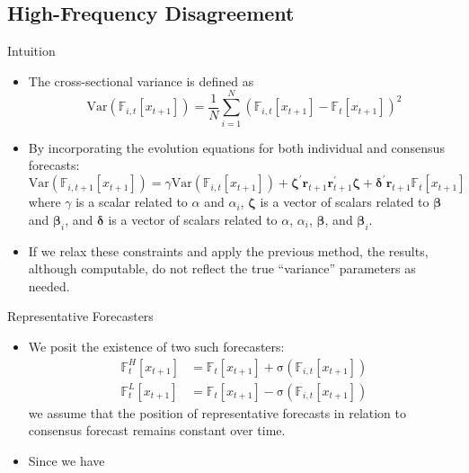 \documentclass[UTF8, 10pt]{beamer}
\begin{document}
\begin{CJK*}{UTF8}{gbsn}
\section{High-Frequency Disagreement}
\begin{frame}{Intuition}
	\begin{itemize}
		\item The \alert{cross-sectional variance} is defined as 
			$$
			\mathrm{Var}(\mathbb{F}_{i, t}\left[x_{t+1}\right]) = \frac{1}{N}\sum_{i=1}^N (\mathbb{F}_{i, t}\left[x_{t+1}\right]-\mathbb{F}_{t}\left[x_{t+1}\right])^2
			$$
		\item By incorporating the \alert{evolution equations} for both individual and consensus forecasts:
			$$
			\mathrm{Var}(\mathbb{F}_{i, t+1}\left[x_{t+1}\right])
		    =
		    \gamma \mathrm{Var}(\mathbb{F}_{i, t}\left[x_{t+1}\right])
		    + \boldsymbol{\zeta}^{\prime} \mathbf{r}_{t+1} \mathbf{r}_{t+1}^\prime \boldsymbol{\zeta}
		    +
		    \boldsymbol{\delta}^\prime \mathbf{r}_{t+1} \mathbb{F}_{t}\left[x_{t+1}\right]
			$$
			where $\gamma$ is a scalar related to $\alpha$ and $\alpha_i$, $\boldsymbol{\zeta}$ is a vector of scalars related to $\boldsymbol{\beta}$ and $\boldsymbol{\beta}_i$, and $\boldsymbol{\delta}$ is a vector of scalars related to $\alpha$, $\alpha_i$, $\boldsymbol{\beta}$, and $\boldsymbol{\beta}_i$.
		\item If we \alert{relax these constraints} and apply the previous method, the results, although computable, do not reflect the \alert{true ``variance'' parameters} as needed.
	\end{itemize}
\end{frame}
\begin{frame}{Representative Forecasters}
	\begin{itemize}
		\item We posit the existence of two such forecasters:
			$$
			\begin{aligned}
		        \mathbb{F}_{t}^{H}\left[x_{t+1}\right]
		        & = \mathbb{F}_{t}\left[x_{t+1}\right] + \mathrm{\sigma}\left(\mathbb{F}_{i, t}\left[x_{t+1}\right]\right)
		        \\
		        \mathbb{F}_{t}^{L}\left[x_{t+1}\right]
		        & = \mathbb{F}_{t}\left[x_{t+1}\right] - \mathrm{\sigma}\left(\mathbb{F}_{i, t}\left[x_{t+1}\right]\right)
		    \end{aligned}
			$$
			we assume that the \alert{position} of representative forecasts in relation to consensus forecast \alert{remains constant} over time.
		\item Since we have

\end{itemize}
\end{frame}
\end{CJK*}
\end{document}
